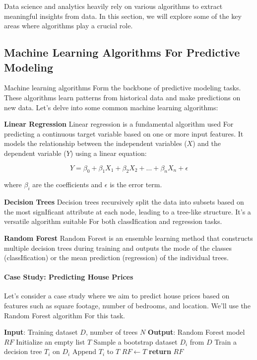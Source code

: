 \documentclass[12pt]{book} %
\begin{document}
Data science and analytics heavily rely on various algorithms to extract meaningful insights from data. In this section, we will explore some of the key areas where algorithms play a crucial role.

\subsection{Machine Learning Algorithms For Predictive Modeling}

Machine learning algorithms Form the backbone of predictive modeling tasks. These algorithms learn patterns from historical data and make predictions on new data. Let's delve into some common machine learning algorithms:

\textbf{Linear Regression}
Linear regression is a fundamental algorithm used For predicting a continuous target variable based on one or more input features. It models the relationship between the independent variables ($X$) and the dependent variable ($Y$) using a linear equation:

\[
Y = \beta_0 + \beta_1X_1 + \beta_2X_2 + \ldots + \beta_nX_n + \epsilon
\]

where $\beta_i$ are the coefficients and $\epsilon$ is the error term.

\textbf{Decision Trees}
Decision trees recursively split the data into subsets based on the most signIficant attribute at each node, leading to a tree-like structure. It's a versatile algorithm suitable For both classIfication and regression tasks.

\textbf{Random Forest}
Random Forest is an ensemble learning method that constructs multiple decision trees during training and outputs the mode of the classes (classIfication) or the mean prediction (regression) of the individual trees.

\paragraph{Case Study: Predicting House Prices}
Let's consider a case study where we aim to predict house prices based on features such as square footage, number of bedrooms, and location. We'll use the Random Forest algorithm For this task.
\FloatBarrier
\begin{algorithm}[H]
\caption{Random Forest For House Price Prediction}\label{alg:random_Forest}
\begin{algorithmic}[1]
\State \textbf{Input}: Training dataset $D$, number of trees $N$
\State \textbf{Output}: Random Forest model $RF$
\State Initialize an empty list $T$
    \State Sample a bootstrap dataset $D_i$ from $D$
    \State Train a decision tree $T_i$ on $D_i$
    \State Append $T_i$ to $T$
\EndFor
\State $RF \gets T$
\State \textbf{return} $RF$
\end{algorithmic}
\end{algorithm}
\FloatBarrier
\end{document}
